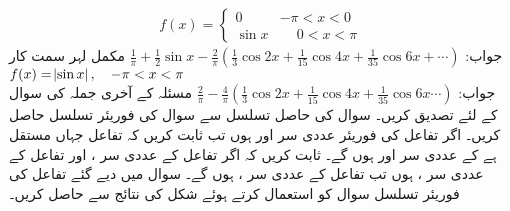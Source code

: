 \begin{align*}
f(x)=
\begin{cases}
0& -\pi<x<0\\
\sin x&\phantom{-} 0<x<\pi
\end{cases}
\end{align*}
جواب:\quad
$\tfrac{1}{\pi}+\frac{1}{2}\sin x-\tfrac{2}{\pi}(\frac{1}{3}\cos 2x+\tfrac{1}{15}\cos 4x+\tfrac{1}{35}\cos 6x+\cdots)$
\quad مکمل لہر سمت کار
$f(x)=\abs{\sin x},\quad  -\pi<x<\pi$\\
جواب:\quad
$\tfrac{2}{\pi}-\tfrac{4}{\pi}(\tfrac{1}{3}\cos 2x+\tfrac{1}{15}\cos 4x+\frac{1}{35}\cos 6x\cdots)$
\quad مسئلہ  کے آخری جملہ کی سوال  کے لئے  تصدیق کریں۔ 
\quad سوال  کی حاصل تسلسل سے سوال  کی فوریئر تسلسل حاصل کریں۔
\quad اگر تفاعل  کی فوریئر عددی سر  اور  ہوں تب ثابت کریں کہ تفاعل  جہاں  مستقل ہے کے عددی سر
 اور  ہوں گے۔
\quad ثابت کریں کہ اگر تفاعل  کے عددی سر ،  اور تفاعل  کے عددی سر ،  ہوں تب تفاعل  کے عددی سر ،  ہوں گے۔
\quad سوال  میں دیے گئے تفاعل کی فوریئر تسلسل سوال  کو استعمال کرتے ہوئے شکل  کی نتائج سے  حاصل کریں۔

